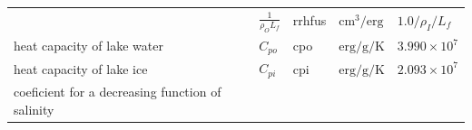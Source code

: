 \begin{longtable}[]{@{}lllll@{}}
\begin{minipage}[t]{0.31\columnwidth}
\strut
\end{minipage} & \begin{minipage}[t]{0.19\columnwidth}\raggedright
\(\frac{1}{\rho_O L_f}\)\strut
\end{minipage} & \begin{minipage}[t]{0.08\columnwidth}\raggedright
rrhfus\strut
\end{minipage} & \begin{minipage}[t]{0.12\columnwidth}\raggedright
\(\mathrm{cm^3/erg}\)\strut
\end{minipage} & \begin{minipage}[t]{0.17\columnwidth}\raggedright
\(1.0 /\rho_I/L_f\)\strut
\end{minipage}\tabularnewline
\begin{minipage}[t]{0.31\columnwidth}\raggedright
heat capacity of lake water\strut
\end{minipage} & \begin{minipage}[t]{0.19\columnwidth}\raggedright
\(C_{po}\)\strut
\end{minipage} & \begin{minipage}[t]{0.08\columnwidth}\raggedright
cpo\strut
\end{minipage} & \begin{minipage}[t]{0.12\columnwidth}\raggedright
\(\mathrm{erg/g/K}\)\strut
\end{minipage} & \begin{minipage}[t]{0.17\columnwidth}\raggedright
\(3.990\times 10^7\)\strut
\end{minipage}\tabularnewline
\begin{minipage}[t]{0.31\columnwidth}\raggedright
heat capacity of lake ice\strut
\end{minipage} & \begin{minipage}[t]{0.19\columnwidth}\raggedright
\(C_{pi}\)\strut
\end{minipage} & \begin{minipage}[t]{0.08\columnwidth}\raggedright
cpi\strut
\end{minipage} & \begin{minipage}[t]{0.12\columnwidth}\raggedright
\(\mathrm{erg/g/K}\)\strut
\end{minipage} & \begin{minipage}[t]{0.17\columnwidth}\raggedright
\(2.093\times 10^7\)\strut
\end{minipage}\tabularnewline
\begin{minipage}[t]{0.31\columnwidth}\raggedright
coeficient for a decreasing function of salinity\strut

\end{minipage}
\end{longtable}
